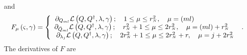 \documentclass[aps,preprint]{revtex4}%
\begin{document}
and
\begin{equation}
F_{\mu}\left(  \varsigma,\gamma\right)  =\left\{
\begin{array}
[c]{c}%
\partial_{Q_{ml}}\mathcal{L}\left(  Q,Q^{\dagger},\lambda,\gamma\right)
;\quad1\leq\mu\leq r_{^{N}}^{2},\quad\mu=\left(  ml\right)  \qquad\qquad
\qquad\\
\partial_{\bar{Q}_{ml}}\mathcal{L}\left(  Q,Q^{\dagger},\lambda,\gamma\right)
;\quad r_{^{N}}^{2}+1\leq\mu\leq2r_{^{N}}^{2},\quad\mu=\left(  ml\right)
+r_{^{N}}^{2}\quad\\
\partial_{\lambda_{j}}\mathcal{L}\left(  Q,Q^{\dagger},\lambda,\gamma\right)
;\quad2r_{^{N}}^{2}+1\leq\mu\leq2r_{^{N}}^{2}+r,\quad\mu=j+2r_{^{N}}^{2}%
\end{array}
\right.  .
\end{equation}
The derivatives of $F$ are
\end{document}
